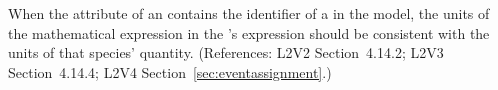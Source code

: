 When the  attribute of an \EventAssignment
contains the identifier of a \Species in the model, the
units of the mathematical expression in the
\EventAssignment's  expression should be
consistent with the units of that species' quantity.
(References: L2V2 Section~4.14.2; L2V3 Section~4.14.4; L2V4 Section~\ref{sec:eventassignment}.)
